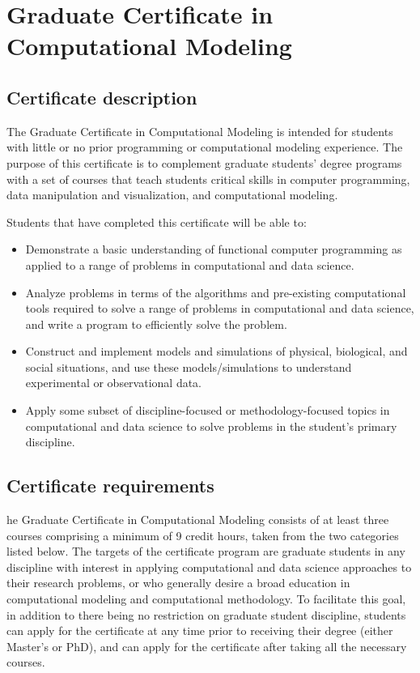 \section{Graduate Certificate in Computational Modeling}
\label{sec:cert_model}

\subsection{Certificate description}

The Graduate Certificate in Computational Modeling is intended for
students with little or no prior programming or computational modeling
experience. The purpose of this certificate is to complement graduate
students' degree programs with a set of courses that teach students
critical skills in computer programming, data manipulation and
visualization, and computational modeling.  

Students that have completed this certificate will be able to: 

\begin{itemize} 
\item  Demonstrate a basic understanding of functional computer
  programming as applied to a range of problems in computational and
  data science.  

\item  Analyze problems in terms of the algorithms and pre-existing
  computational tools required to solve a range of problems in
  computational and data science, and write a program to efficiently
  solve the problem.  

\item  Construct and implement models and simulations of physical,
  biological, and social situations, and use these models/simulations
  to understand experimental or observational data.  

\item  Apply some subset of discipline-focused or methodology-focused
topics in computational and data science to solve problems in the
student’s primary discipline.

\end{itemize}

\subsection{Certificate requirements}

he Graduate Certificate in Computational Modeling consists of at least
three courses comprising a minimum of 9 credit hours, taken from the
two categories listed below.  The targets of the certificate program
are graduate students in any discipline with interest in applying
computational and data science approaches to their research problems,
or who generally desire a broad education in computational modeling
and computational methodology.  To facilitate this goal, in addition
to there being no restriction on graduate student discipline, students
can apply for the certificate at any time prior to receiving their
degree (either Master’s or PhD), and can apply for the certificate
after taking all the necessary courses. 

